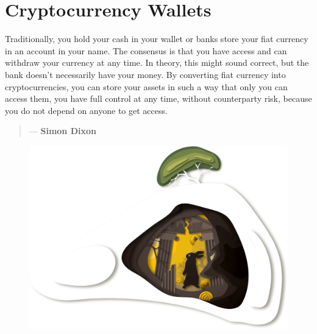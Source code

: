 \chapter{Cryptocurrency Wallets}
\label{ch:wallets}

Traditionally, you hold your cash in your wallet or banks store your fiat currency in an account in your name. The consensus is that you have access and can withdraw your currency at any time. In theory, this might sound correct, but the bank doesn't necessarily have your money. By converting fiat currency into cryptocurrencies, you can store your assets in such a way that only you can access them, you have full control at any time, without counterparty risk, because you  do not depend on anyone to get access.


\begin{quotation}
      \textit{}
      \begin{flushright}
        \small{--- \textbf{Simon Dixon}}
      \end{flushright}
    
\end{quotation}

\begin{figure}
    \centering
    \includegraphics[width=\textwidth]{illustrations/resized_CRYPTO_KEY_1_PART_3.jpg}
\end{figure}

